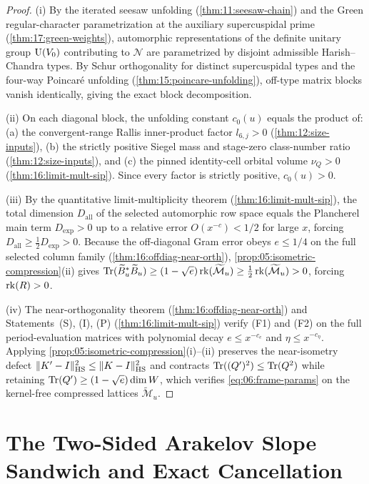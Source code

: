 \begin{proof}
(i) By the iterated seesaw unfolding (\cref{thm:11:seesaw-chain}) and the Green regular-character parametrization at the auxiliary supercuspidal prime (\cref{thm:17:green-weights}), automorphic representations of the definite unitary group $\mathrm{U}(V_0)$ contributing to $\mathcal{N}$ are parametrized by disjoint admissible Harish--Chandra types. By Schur orthogonality for distinct supercuspidal types and the four-way Poincar\'e unfolding (\cref{thm:15:poincare-unfolding}), off-type matrix blocks vanish identically, giving the exact block decomposition.

(ii) On each diagonal block, the unfolding constant $c_0(u)$ equals the product of: (a) the convergent-range Rallis inner-product factor $l_{6,j} > 0$ (\cref{thm:12:size-inputs}), (b) the strictly positive Siegel mass and stage-zero class-number ratio (\cref{thm:12:size-inputs}), and (c) the pinned identity-cell orbital volume $\nu_Q > 0$ (\cref{thm:16:limit-mult-sip}). Since every factor is strictly positive, $c_0(u) > 0$.

(iii) By the quantitative limit-multiplicity theorem (\cref{thm:16:limit-mult-sip}), the total dimension $D_{\mathrm{all}}$ of the selected automorphic row space equals the Plancherel main term $D_{\mathrm{exp}} > 0$ up to a relative error $O(x^{-c}) < 1/2$ for large $x$, forcing $D_{\mathrm{all}} \ge \frac{1}{2} D_{\mathrm{exp}} > 0$. Because the off-diagonal Gram error obeys $e \le 1/4$ on the full selected column family (\cref{thm:16:offdiag-near-orth}), \cref{prop:05:isometric-compression}(ii) gives $\operatorname{Tr}(\widetilde{B}_u^* \widetilde{B}_u) \ge (1 - \sqrt{e}) \operatorname{rk}(\widetilde{\mathcal{M}}_u) \ge \frac{1}{2}\operatorname{rk}(\widetilde{\mathcal{M}}_u) > 0$, forcing $\operatorname{rk}(R) > 0$.

(iv) The near-orthogonality theorem (\cref{thm:16:offdiag-near-orth}) and Statements~(S), (I), (P) (\cref{thm:16:limit-mult-sip}) verify (F1) and (F2) on the full period-evaluation matrices with polynomial decay $e \le x^{-c_e}$ and $\eta \le x^{-c_\eta}$. Applying \cref{prop:05:isometric-compression}(i)--(ii) preserves the near-isometry defect $\|K' - I\|_{\mathrm{HS}}^2 \le \|K - I\|_{\mathrm{HS}}^2$ and contracts $\operatorname{Tr}((Q')^2) \le \operatorname{Tr}(Q^2)$ while retaining $\operatorname{Tr}(Q') \ge (1 - \sqrt{e})\dim W$, which verifies \eqref{eq:06:frame-params} on the kernel-free compressed lattices $\widetilde{\mathcal{M}}_u$.
\end{proof}

\section{The Two-Sided Arakelov Slope Sandwich and Exact Cancellation}
\label{sec:06:slope-sandwich}

